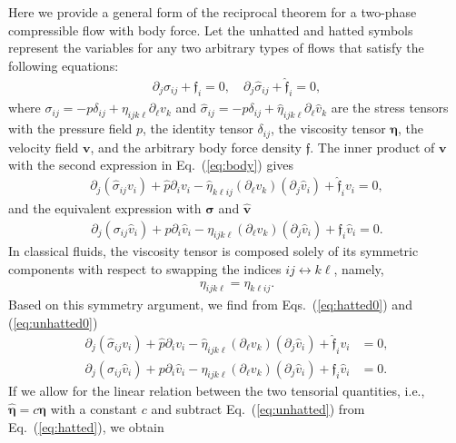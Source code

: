 Here we provide a general form of the reciprocal theorem for a two-phase compressible flow with body force.
Let the unhatted and hatted symbols represent the variables for any two arbitrary types of flows that satisfy the following equations:
\begin{align}
    \partial_j\sigma_{ij}+\mathfrak{f}_i=0,\quad
    \partial_j\hat{\sigma}_{ij}+\hat{\mathfrak{f}}_i=0,
    \label{eq:body}
\end{align}
where $\sigma_{ij}=-p\delta_{ij}+\eta_{ijk\ell}\partial_\ell v_k$ and $\hat{\sigma}_{ij}=-\hat{p}\delta_{ij}+\hat{\eta}_{ijk\ell}\partial_\ell\hat{v}_k$ are the stress tensors with the pressure field $p$, the identity tensor $\delta_{ij}$, the viscosity tensor $\boldsymbol{\eta}$, the velocity field $\mathbf{v}$, and the arbitrary body force density $\boldsymbol{\mathfrak{f}}$.
The inner product of $\mathbf{v}$ with the second expression in Eq.~(\ref{eq:body}) gives
\begin{align}
    \partial_j (\hat{\sigma}_{ij}v_i)+\hat{p}\partial_iv_i
    -\hat{\eta}_{k\ell ij}(\partial_\ell v_k)(\partial_j\hat{v}_i)
    + \hat{\mathfrak{f}}_iv_i = 0,
    \label{eq:hatted0}
\end{align}
and the equivalent expression with $\boldsymbol{\sigma}$ and $\hat{\mathbf{v}}$
\begin{align}
    \partial_j (\sigma_{ij}\hat{v}_i)+p\partial_i\hat{v}_i
    -\eta_{ijk\ell}(\partial_\ell v_k)(\partial_j\hat{v}_i)
    + \mathfrak{f}_i\hat{v}_i = 0.
    \label{eq:unhatted0}
\end{align}
In classical fluids, the viscosity tensor is composed solely of its symmetric components with respect to swapping the indices $ij\leftrightarrow k\ell$, namely,
\begin{align}
    \eta_{ijk\ell}= \eta_{k\ell ij}.
\end{align}
Based on this symmetry argument, we find from Eqs.~(\ref{eq:hatted0}) and (\ref{eq:unhatted0})
\begin{align}
    \partial_j (\hat{\sigma}_{ij}v_i)+\hat{p}\partial_iv_i
    -\hat{\eta}_{ijk\ell}(\partial_\ell v_k)(\partial_j\hat{v}_i)
    + \hat{\mathfrak{f}}_iv_i &= 0, \label{eq:hatted}\\
    \partial_j (\sigma_{ij}\hat{v}_i)+p\partial_i\hat{v}_i
    -\eta_{ijk\ell}(\partial_\ell v_k)(\partial_j\hat{v}_i)
    + \mathfrak{f}_i\hat{v}_i &= 0. \label{eq:unhatted}
\end{align}
If we allow for the linear relation between the two tensorial quantities, i.e., $
\hat{\boldsymbol{\eta}}=c\boldsymbol{\eta}$ with a constant $c$ and subtract Eq.~(\ref{eq:unhatted}) from Eq.~(\ref{eq:hatted}), we obtain

